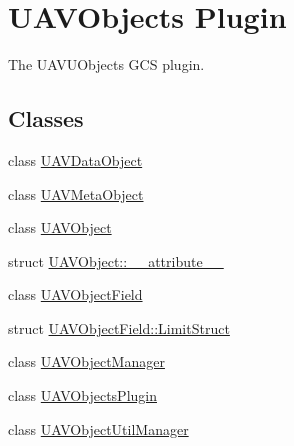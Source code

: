 \hypertarget{group___u_a_v_objects_plugin}{\section{\-U\-A\-V\-Objects \-Plugin}
\label{group___u_a_v_objects_plugin}
}


\-The \-U\-A\-V\-U\-Objects \-G\-C\-S plugin.  


\subsection*{\-Classes}
\begin{DoxyCompactItemize}
\item 
class \hyperlink{class_u_a_v_data_object}{\-U\-A\-V\-Data\-Object}
\item 
class \hyperlink{class_u_a_v_meta_object}{\-U\-A\-V\-Meta\-Object}
\item 
class \hyperlink{class_u_a_v_object}{\-U\-A\-V\-Object}
\item 
struct \hyperlink{struct_u_a_v_object_1_1____attribute____}{\-U\-A\-V\-Object\-::\-\_\-\-\_\-attribute\-\_\-\-\_\-}
\item 
class \hyperlink{class_u_a_v_object_field}{\-U\-A\-V\-Object\-Field}
\item 
struct \hyperlink{struct_u_a_v_object_field_1_1_limit_struct}{\-U\-A\-V\-Object\-Field\-::\-Limit\-Struct}
\item 
class \hyperlink{class_u_a_v_object_manager}{\-U\-A\-V\-Object\-Manager}
\item 
class \hyperlink{class_u_a_v_objects_plugin}{\-U\-A\-V\-Objects\-Plugin}
\item 
class \hyperlink{class_u_a_v_object_util_manager}{\-U\-A\-V\-Object\-Util\-Manager}
\end{DoxyCompactItemize}
